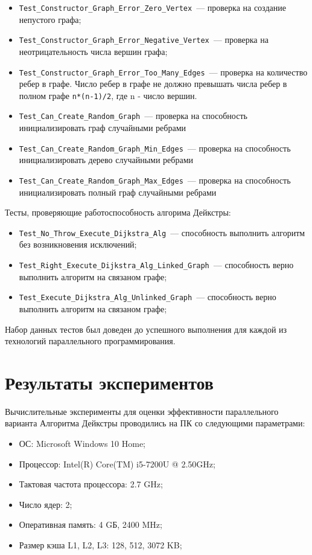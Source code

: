 \documentclass{article}
\begin{document}
\begin{itemize}
\item \verb|Test_Constructor_Graph_Error_Zero_Vertex|~--- проверка на создание непустого графа;
\item \verb|Test_Constructor_Graph_Error_Negative_Vertex|~--- проверка на неотрицательность числа вершин графа;
\item \verb|Test_Constructor_Graph_Error_Too_Many_Edges|~--- проверка на количество ребер в графе. Число ребер в графе не должно превышать числа ребер в полном графе \verb|n*(n-1)/2|, где n - число вершин.
\item \verb|Test_Can_Create_Random_Graph|~--- проверка на способность инициализировать граф случайными ребрами
\item \verb|Test_Can_Create_Random_Graph_Min_Edges|~--- проверка на способность инициализировать дерево случайными ребрами
\item \verb|Test_Can_Create_Random_Graph_Max_Edges|~--- проверка на способность инициализировать полный граф случайными ребрами
\end{itemize}
\par Тесты, проверяющие работоспособность алгорима Дейкстры:
\begin{itemize}
\item \verb|Test_No_Throw_Execute_Dijkstra_Alg|~--- способность выполнить алгоритм без возникновения исключений;
\item \verb|Test_Right_Execute_Dijkstra_Alg_Linked_Graph|~--- способность верно выполнить алгоритм на связаном графе;
\item \verb|Test_Execute_Dijkstra_Alg_Unlinked_Graph|~--- способность верно выполнить алгоритм на связаном графе;
\end{itemize}

\par Набор данных тестов был доведен до успешного выполнения для каждой из технологий параллельного программирования.

\newpage

\section{Результаты экспериментов}
Вычислительные эксперименты для оценки эффективности параллельного варианта Алгоритма Дейкстры проводились на ПК со следующими параметрами:

\begin{itemize}
\item ОС: Microsoft Windows 10 Home;
\item Процессор: Intel(R) Core(TM) i5-7200U @ 2.50GHz;
\item Тактовая частота процессора: 2.7 GHz;
\item Число ядер: 2;
\item Оперативная память: 4 GБ, 2400 MHz;
\item Размер кэша L1, L2, L3: 128, 512, 3072 KB;
\end{itemize}
\end{document}
